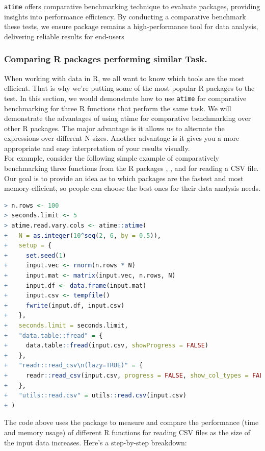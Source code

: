 \noindent \texttt{atime} offers comparative benchmarking technique to evaluate packages, providing insights into performance efficiency. By conducting a comparative benchmark these tests, we ensure package remains a high-performance tool for data analysis, delivering reliable results for end-users\\

\subsubsection{Comparing R packages performing similar Task.}
\noindent When working with data in R, we all want to know which tools are the most efficient. That is why we're putting some of the most popular R packages to the test. 
In this section, we would demonstrate how to use \texttt{atime} for comparative benchmarking for three R functions that perform the same task. We will demonstrate the advantages of using atime for comparative benchmarking over other R packages. The major advantage is it allows us to alternate the expressions over different N sizes. Another advantage is it gives you a more appropriate and easy interpretation of your results visually.\\

\noindent For example, consider the following simple example of comparatively benchmarking three functions from the R packages , , and  for reading a CSV file. Our goal is to provide an idea as to which packages are the fastest and most memory-efficient, so people can choose the best ones for their data analysis needs.\\

\begin{lstlisting}[language=R]
> n.rows <- 100
> seconds.limit <- 5
> atime.read.vary.cols <- atime::atime(
+   N = as.integer(10^seq(2, 6, by = 0.5)),
+   setup = {
+     set.seed(1)
+     input.vec <- rnorm(n.rows * N)
+     input.mat <- matrix(input.vec, n.rows, N)
+     input.df <- data.frame(input.mat)
+     input.csv <- tempfile()
+     fwrite(input.df, input.csv)
+   },
+   seconds.limit = seconds.limit,
+   "data.table::fread" = {
+     data.table::fread(input.csv, showProgress = FALSE)
+   },
+   "readr::read_csv\n(lazy=TRUE)" = {
+     readr::read_csv(input.csv, progress = FALSE, show_col_types = FALSE, lazy = TRUE)
+   },
+   "utils::read.csv" = utils::read.csv(input.csv)
+ )
\end{lstlisting}

The code above uses the  package to measure and compare the performance (time and memory usage) of different R functions for reading CSV files as the size of the input data increases. Here's a step-by-step breakdown:

